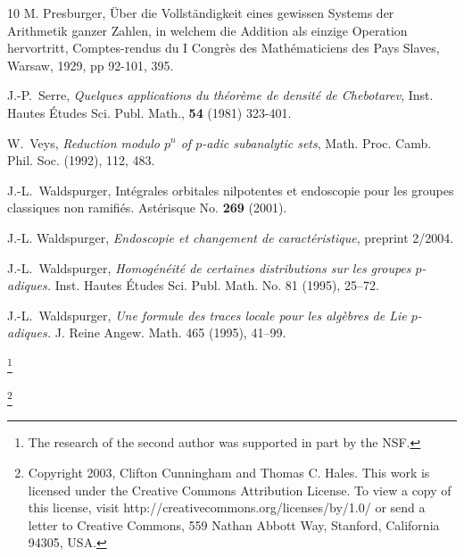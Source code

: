 \documentclass[11pt]{amsart}
\theoremstyle{definition}
\theoremstyle{remark}
\numberwithin{equation}{theorem}
\begin{document}
\begin{thebibliography}{10}
 M. Presburger, \"Uber die Vollst\"andigkeit
eines gewissen Systems der Arithmetik ganzer Zahlen, in welchem
die Addition als einzige Operation hervortritt, Comptes-rendus du
I Congr\`es des Math\'ematiciens des Pays Slaves, Warsaw, 1929, pp
92-101, 395.



 J.-P.~Serre, {\it Quelques applications du th\'eor\`eme
de densit\'e de Chebotarev}, Inst. Hautes \'Etudes Sci. Publ.
Math., {\bf 54} (1981) 323-401.

 W.~Veys, {\it Reduction modulo $p^n$ of $p$-adic
subanalytic sets}, Math. Proc. Camb. Phil. Soc. (1992), 112, 483.

 J.-L.~Waldspurger,
Int\'egrales orbitales nilpotentes et endoscopie pour les groupes
classiques non ramifi\'es. Ast\'erisque No. {\bf 269} (2001).


 J.-L. Waldspurger, {\em Endoscopie et changement de
caract\'eristique}, preprint 2/2004.

 J.-L.~Waldspurger, {\it
Homog\'en\'eit\'e de certaines distributions sur
les groupes $p$-adiques.}  Inst. Hautes {\'E}tudes Sci. Publ.
Math. No. 81 (1995), 25--72.

 J.-L.~Waldspurger, {\it Une formule des traces locale pour les
alg\`ebres de Lie $p$-adiques.}  J. Reine Angew. Math. 465 (1995),
41--99.


\end{thebibliography}

    \renewcommand{\thefootnote}{}
    \footnote{The research of the second author was supported in part by the
NSF.}

    \footnote{Copyright 2003, Clifton Cunningham and Thomas C. Hales.
This work is licensed under the Creative Commons Attribution
License. To view a copy of this license, visit
http://creativecommons.org/licenses/by/1.0/ or send a letter to
Creative Commons, 559 Nathan Abbott Way, Stanford, California
94305, USA.}
\end{document}
